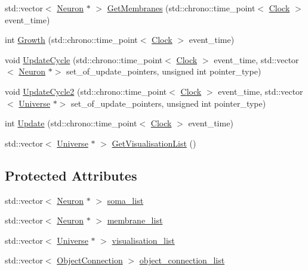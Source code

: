 \begin{DoxyCompactItemize}
\item 
std\+::vector$<$ \hyperlink{class_neuron}{Neuron} $\ast$ $>$ \hyperlink{class_neuron_ac759d9589c0505332e8238cafbc8fa66}{Get\+Membranes} (std\+::chrono\+::time\+\_\+point$<$ \hyperlink{universe_8h_a0ef8d951d1ca5ab3cfaf7ab4c7a6fd80}{Clock} $>$ event\+\_\+time)
\item 
int \hyperlink{class_neuron_a82b34717999a29e5413ebfcfa58c9356}{Growth} (std\+::chrono\+::time\+\_\+point$<$ \hyperlink{universe_8h_a0ef8d951d1ca5ab3cfaf7ab4c7a6fd80}{Clock} $>$ event\+\_\+time)
\item 
void \hyperlink{class_neuron_a06f45a5d1de890da84d3644fe58ea0a9}{Update\+Cycle} (std\+::chrono\+::time\+\_\+point$<$ \hyperlink{universe_8h_a0ef8d951d1ca5ab3cfaf7ab4c7a6fd80}{Clock} $>$ event\+\_\+time, std\+::vector$<$ \hyperlink{class_neuron}{Neuron} $\ast$$>$ set\+\_\+of\+\_\+update\+\_\+pointers, unsigned int pointer\+\_\+type)
\item 
void \hyperlink{class_neuron_a55c72e8066caf1ad8e25a2b0b453ee69}{Update\+Cycle2} (std\+::chrono\+::time\+\_\+point$<$ \hyperlink{universe_8h_a0ef8d951d1ca5ab3cfaf7ab4c7a6fd80}{Clock} $>$ event\+\_\+time, std\+::vector$<$ \hyperlink{class_universe}{Universe} $\ast$$>$ set\+\_\+of\+\_\+update\+\_\+pointers, unsigned int pointer\+\_\+type)
\item 
int \hyperlink{class_neuron_a4d1dc3a9f30196fe2b09dfbfc0a567bb}{Update} (std\+::chrono\+::time\+\_\+point$<$ \hyperlink{universe_8h_a0ef8d951d1ca5ab3cfaf7ab4c7a6fd80}{Clock} $>$ event\+\_\+time)
\item 
std\+::vector$<$ \hyperlink{class_universe}{Universe} $\ast$ $>$ \hyperlink{class_neuron_a9af31418d1232135bf5074f6a3d5dbf1}{Get\+Visualisation\+List} ()
\end{DoxyCompactItemize}
\subsection*{Protected Attributes}
\begin{DoxyCompactItemize}
\item 
std\+::vector$<$ \hyperlink{class_neuron}{Neuron} $\ast$ $>$ \hyperlink{class_neuron_abb3745c6a8727f4ceb8db9e2258b90b5}{soma\+\_\+list}
\item 
std\+::vector$<$ \hyperlink{class_neuron}{Neuron} $\ast$ $>$ \hyperlink{class_neuron_a878a5a42025ba8205adeb9a50b2c1457}{membrane\+\_\+list}
\item 
std\+::vector$<$ \hyperlink{class_universe}{Universe} $\ast$ $>$ \hyperlink{class_neuron_a00b1e2e5f9d224759df1aa54093092ba}{visualisation\+\_\+list}
\item 
std\+::vector$<$ \hyperlink{struct_neuron_1_1_object_connection}{Object\+Connection} $>$ \hyperlink{class_neuron_a8259952162df5c8bb66eb78126feafe6}{object\+\_\+connection\+\_\+list}
\end{DoxyCompactItemize}
